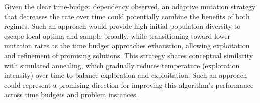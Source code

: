 \documentclass[11pt,a4paper]{article}
\begin{document}
Given the clear time-budget dependency observed, an adaptive mutation strategy that decreases the rate over time could potentially combine the benefits of both regimes. Such an approach would provide high initial population diversity to escape local optima and sample broadly, while transitioning toward lower mutation rates as the time budget approaches exhaustion, allowing exploitation and refinement of promising solutions. This strategy shares conceptual similarity with simulated annealing, which gradually reduces temperature (exploration intensity) over time to balance exploration and exploitation. Such an approach could represent a promising direction for improving this algorithm's performance across time budgets and problem instances.
\end{document}
